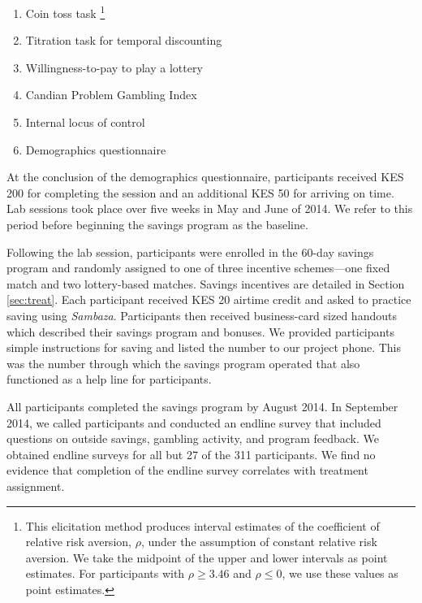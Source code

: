 \documentclass[11pt]{article}
\begin{document}
		\begin{enumerate} \setlength{\itemsep}{1pt}
		\item Coin toss task \footnote{This elicitation method produces interval estimates of the coefficient of relative risk aversion, $\rho$, under the assumption of constant relative risk aversion. We take the midpoint of the upper and lower intervals as point estimates. For participants with $\rho \geq 3.46$ and $\rho \leq 0$, we use these values as point estimates.}
		\item Titration task for temporal discounting 
		\item Willingness-to-pay to play a lottery
		\item Candian Problem Gambling Index 
		\item Internal locus of control 
		\item Demographics questionnaire
		\end{enumerate}

		At the conclusion of the demographics questionnaire, participants received KES 200 for completing the session and an additional KES 50 for arriving on time. Lab sessions took place over five weeks in May and June of 2014. We refer to this period before beginning the savings program as the baseline.

		Following the lab session, participants were enrolled in the 60-day savings program and randomly assigned to one of three incentive schemes---one fixed match and two lottery-based matches. Savings incentives are detailed in Section \ref{sec:treat}. Each participant received KES 20 airtime credit and asked to practice saving using \textit{Sambaza}. Participants then received business-card sized handouts which described their savings program and bonuses. We provided participants simple instructions for saving and listed the number to our project phone. This was the number through which the savings program operated that also functioned as a help line for participants.


		All participants completed the savings program by August 2014. In September 2014, we called participants and conducted an endline survey that included questions on outside savings, gambling activity, and program feedback. We obtained endline surveys for all but 27 of the 311 participants. We find no evidence that completion of the endline survey correlates with treatment assignment.
\end{document}
